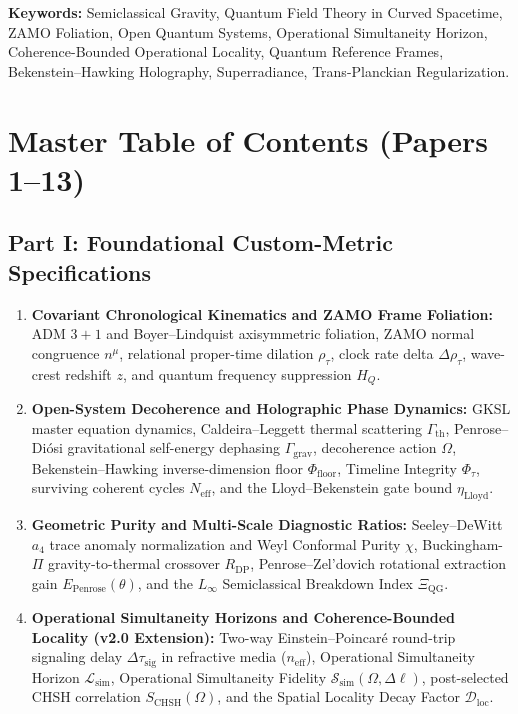 \documentclass[11pt,a4paper]{article}
\begin{document}
\noindent\textbf{Keywords:} Semiclassical Gravity, Quantum Field Theory in Curved Spacetime, ZAMO Foliation, Open Quantum Systems, Operational Simultaneity Horizon, Coherence-Bounded Operational Locality, Quantum Reference Frames, Bekenstein--Hawking Holography, Superradiance, Trans-Planckian Regularization.

\section{Master Table of Contents (Papers 1--13)}

\subsection*{Part I: Foundational Custom-Metric Specifications}
\begin{enumerate}[label=\textbf{\arabic*.}]
    \item \textbf{Covariant Chronological Kinematics and ZAMO Frame Foliation:} ADM $3+1$ and Boyer--Lindquist axisymmetric foliation, ZAMO normal congruence $n^\mu$, relational proper-time dilation $\rho_\tau$, clock rate delta $\Delta\rho_\tau$, wave-crest redshift $z$, and quantum frequency suppression $H_Q$.
    \item \textbf{Open-System Decoherence and Holographic Phase Dynamics:} GKSL master equation dynamics, Caldeira--Leggett thermal scattering $\Gamma_{\mathrm{th}}$, Penrose--Diósi gravitational self-energy dephasing $\Gamma_{\mathrm{grav}}$, decoherence action $\Omega$, Bekenstein--Hawking inverse-dimension floor $\Phi_{\mathrm{floor}}$, Timeline Integrity $\Phi_\tau$, surviving coherent cycles $N_{\mathrm{eff}}$, and the Lloyd--Bekenstein gate bound $\eta_{\mathrm{Lloyd}}$.
    \item \textbf{Geometric Purity and Multi-Scale Diagnostic Ratios:} Seeley--DeWitt $a_4$ trace anomaly normalization and Weyl Conformal Purity $\chi$, Buckingham-$\Pi$ gravity-to-thermal crossover $R_{\mathrm{DP}}$, Penrose--Zel'dovich rotational extraction gain $E_{\mathrm{Penrose}}(\theta)$, and the $L_\infty$ Semiclassical Breakdown Index $\Xi_{\mathrm{QG}}$.
    \item \textbf{Operational Simultaneity Horizons and Coherence-Bounded Locality (v2.0 Extension):} Two-way Einstein--Poincaré round-trip signaling delay $\Delta\tau_{\mathrm{sig}}$ in refractive media ($n_{\mathrm{eff}}$), Operational Simultaneity Horizon $\mathcal{L}_{\mathrm{sim}}$, Operational Simultaneity Fidelity $\mathcal{S}_{\mathrm{sim}}(\Omega,\Delta\ell)$, post-selected CHSH correlation $S_{\mathrm{CHSH}}(\Omega)$, and the Spatial Locality Decay Factor $\mathcal{D}_{\mathrm{loc}}$.
\end{enumerate}
\end{document}

